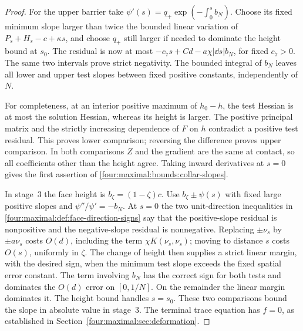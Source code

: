 \begin{proof}
For the upper barrier take
$\psi'(s)=q_+\exp(-\int_0^s b_N)$.
Choose its fixed minimum slope larger than twice the bounded linear
variation of $P_s+H_s-c+\kappa s$, and choose $q_+$ still larger if
needed to dominate the height bound at $s_0$. The residual is now at
most $-c_7s+Cd-a\chi|\dd s|b_N$, for fixed $c_7>0$.
The same two intervals prove strict negativity. The bounded integral
of $b_N$ leaves all lower and upper test slopes between fixed positive
constants, independently of $N$.

For completeness, at an interior positive maximum of
$h_0-h$, the test Hessian is at most the solution Hessian, whereas its
height is larger. The positive principal matrix and the strictly
increasing dependence of $F$ on $h$ contradict a positive test residual.
This proves lower comparison; reversing the difference proves upper
comparison. In both comparisons $Z$ and the gradient are the same
at contact, so all coefficients other than the height agree.
Taking inward derivatives at $s=0$ gives the first assertion of
\eqref{four:maximal:bounds:collar-slopes}.

In stage~3 the face height is $b_\zeta=(1-\zeta)c$.
Use $b_\zeta\pm\psi(s)$ with fixed large positive slopes and
$\psi''/\psi'=-b_N$. At $s=0$ the two unit-direction inequalities
in \eqref{four:maximal:def:face-direction-signs} say that the positive-slope residual is nonpositive
and the negative-slope residual is nonnegative. Replacing $\pm \nu_s$ by
$\pm a\nu_s$ costs $O(d)$, including the term $\chi K(\nu_s,\nu_s)$; moving to
distance $s$ costs $O(s)$, uniformly in $\zeta$. The change of height
then supplies a strict linear margin, with the desired sign, when the
minimum test slope exceeds the fixed spatial error constant.
The term involving $b_N$ has the correct sign for both tests and
dominates the $O(d)$ error on $[0,1/N]$. On the remainder the linear
margin dominates it. The height bound handles $s=s_0$.
These two comparisons bound the slope in absolute value in stage~3.
The terminal trace equation has $f=0$, as established in
Section~\ref{four:maximal:sec:deformation}.
\end{proof}

